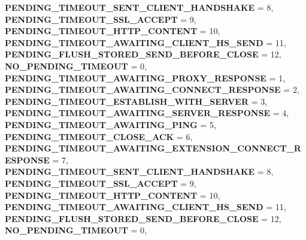 \begin{DoxyCompactItemize}
{\bfseries P\+E\+N\+D\+I\+N\+G\+\_\+\+T\+I\+M\+E\+O\+U\+T\+\_\+\+S\+E\+N\+T\+\_\+\+C\+L\+I\+E\+N\+T\+\_\+\+H\+A\+N\+D\+S\+H\+A\+KE} = 8, 
{\bfseries P\+E\+N\+D\+I\+N\+G\+\_\+\+T\+I\+M\+E\+O\+U\+T\+\_\+\+S\+S\+L\+\_\+\+A\+C\+C\+E\+PT} = 9, 
\newline
{\bfseries P\+E\+N\+D\+I\+N\+G\+\_\+\+T\+I\+M\+E\+O\+U\+T\+\_\+\+H\+T\+T\+P\+\_\+\+C\+O\+N\+T\+E\+NT} = 10, 
{\bfseries P\+E\+N\+D\+I\+N\+G\+\_\+\+T\+I\+M\+E\+O\+U\+T\+\_\+\+A\+W\+A\+I\+T\+I\+N\+G\+\_\+\+C\+L\+I\+E\+N\+T\+\_\+\+H\+S\+\_\+\+S\+E\+ND} = 11, 
{\bfseries P\+E\+N\+D\+I\+N\+G\+\_\+\+F\+L\+U\+S\+H\+\_\+\+S\+T\+O\+R\+E\+D\+\_\+\+S\+E\+N\+D\+\_\+\+B\+E\+F\+O\+R\+E\+\_\+\+C\+L\+O\+SE} = 12, 
{\bfseries N\+O\+\_\+\+P\+E\+N\+D\+I\+N\+G\+\_\+\+T\+I\+M\+E\+O\+UT} = 0, 
\newline
{\bfseries P\+E\+N\+D\+I\+N\+G\+\_\+\+T\+I\+M\+E\+O\+U\+T\+\_\+\+A\+W\+A\+I\+T\+I\+N\+G\+\_\+\+P\+R\+O\+X\+Y\+\_\+\+R\+E\+S\+P\+O\+N\+SE} = 1, 
{\bfseries P\+E\+N\+D\+I\+N\+G\+\_\+\+T\+I\+M\+E\+O\+U\+T\+\_\+\+A\+W\+A\+I\+T\+I\+N\+G\+\_\+\+C\+O\+N\+N\+E\+C\+T\+\_\+\+R\+E\+S\+P\+O\+N\+SE} = 2, 
{\bfseries P\+E\+N\+D\+I\+N\+G\+\_\+\+T\+I\+M\+E\+O\+U\+T\+\_\+\+E\+S\+T\+A\+B\+L\+I\+S\+H\+\_\+\+W\+I\+T\+H\+\_\+\+S\+E\+R\+V\+ER} = 3, 
{\bfseries P\+E\+N\+D\+I\+N\+G\+\_\+\+T\+I\+M\+E\+O\+U\+T\+\_\+\+A\+W\+A\+I\+T\+I\+N\+G\+\_\+\+S\+E\+R\+V\+E\+R\+\_\+\+R\+E\+S\+P\+O\+N\+SE} = 4, 
\newline
{\bfseries P\+E\+N\+D\+I\+N\+G\+\_\+\+T\+I\+M\+E\+O\+U\+T\+\_\+\+A\+W\+A\+I\+T\+I\+N\+G\+\_\+\+P\+I\+NG} = 5, 
{\bfseries P\+E\+N\+D\+I\+N\+G\+\_\+\+T\+I\+M\+E\+O\+U\+T\+\_\+\+C\+L\+O\+S\+E\+\_\+\+A\+CK} = 6, 
{\bfseries P\+E\+N\+D\+I\+N\+G\+\_\+\+T\+I\+M\+E\+O\+U\+T\+\_\+\+A\+W\+A\+I\+T\+I\+N\+G\+\_\+\+E\+X\+T\+E\+N\+S\+I\+O\+N\+\_\+\+C\+O\+N\+N\+E\+C\+T\+\_\+\+R\+E\+S\+P\+O\+N\+SE} = 7, 
{\bfseries P\+E\+N\+D\+I\+N\+G\+\_\+\+T\+I\+M\+E\+O\+U\+T\+\_\+\+S\+E\+N\+T\+\_\+\+C\+L\+I\+E\+N\+T\+\_\+\+H\+A\+N\+D\+S\+H\+A\+KE} = 8, 
\newline
{\bfseries P\+E\+N\+D\+I\+N\+G\+\_\+\+T\+I\+M\+E\+O\+U\+T\+\_\+\+S\+S\+L\+\_\+\+A\+C\+C\+E\+PT} = 9, 
{\bfseries P\+E\+N\+D\+I\+N\+G\+\_\+\+T\+I\+M\+E\+O\+U\+T\+\_\+\+H\+T\+T\+P\+\_\+\+C\+O\+N\+T\+E\+NT} = 10, 
{\bfseries P\+E\+N\+D\+I\+N\+G\+\_\+\+T\+I\+M\+E\+O\+U\+T\+\_\+\+A\+W\+A\+I\+T\+I\+N\+G\+\_\+\+C\+L\+I\+E\+N\+T\+\_\+\+H\+S\+\_\+\+S\+E\+ND} = 11, 
{\bfseries P\+E\+N\+D\+I\+N\+G\+\_\+\+F\+L\+U\+S\+H\+\_\+\+S\+T\+O\+R\+E\+D\+\_\+\+S\+E\+N\+D\+\_\+\+B\+E\+F\+O\+R\+E\+\_\+\+C\+L\+O\+SE} = 12, 
\newline
{\bfseries N\+O\+\_\+\+P\+E\+N\+D\+I\+N\+G\+\_\+\+T\+I\+M\+E\+O\+UT} = 0, 

\end{DoxyCompactItemize}
